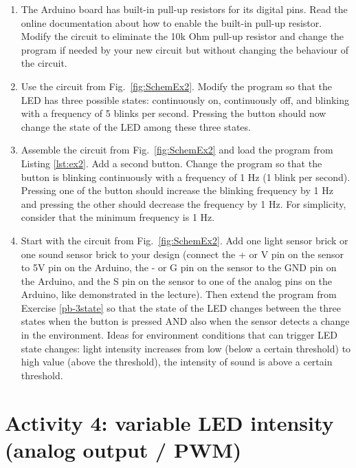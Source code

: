 \documentclass[12pt]{book}
\begin{document}
\begin{enumerate}[1.]
\item The Arduino board has built-in pull-up resistors for its digital
  pins. Read the online documentation about how to enable the built-in
  pull-up resistor. Modify the circuit to eliminate the 10k Ohm
  pull-up resistor and change the program if needed by your new
  circuit but without changing the behaviour of the circuit.

\item\label{pb-3state} Use the circuit from
  Fig.~\ref*{fig:SchemEx2}. Modify the program so that the LED has
  three possible states: continuously on, continuously off, and
  blinking with a frequency of 5 blinks per second. Pressing the
  button should now change the state of the LED among these three
  states.

\item Assemble the circuit from Fig.~\ref*{fig:SchemEx2} and load the program from
  Listing \ref*{lst:ex2}. Add a second button. Change the program so
  that the button is blinking continuously with a frequency of 1 Hz (1
  blink per second). Pressing one of the button should increase the blinking
  frequency by 1 Hz and pressing the other should decrease the
  frequency by 1 Hz. For simplicity, consider that the minimum
  frequency is 1 Hz.

\item\label{pb-sensor} Start with the circuit from
  Fig.~\ref*{fig:SchemEx2}. Add one 
  light sensor brick or one sound sensor brick to your design (connect
  the + or V pin on the sensor to 5V pin on the Arduino, the - or G
  pin on the sensor to the GND pin on the Arduino, and the S pin on
  the sensor to one of the analog pins on the Arduino, like
  demonstrated in the lecture). Then extend the program from Exercise
  \ref{pb-3state} so that the state of the LED changes between the
  three states when the button is pressed AND also when the sensor
  detects a change in the environment. Ideas for environment
  conditions that can trigger LED state changes: light intensity
  increases from low (below a certain threshold) to high value (above
  the threshold), the intensity of sound is above a certain
  threshold. 
\end{enumerate}



\chapter{Activity 4: variable LED intensity (analog output /
  PWM)} \label{se:ch4} 
\end{document}

